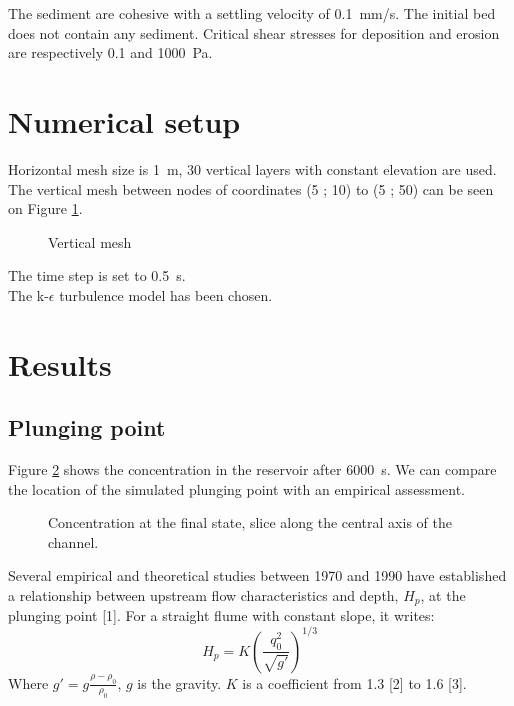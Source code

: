 The sediment are cohesive with a settling velocity of 0.1~mm/s. The initial bed does not contain any sediment. Critical shear stresses for deposition and erosion are respectively 0.1 and 1000~Pa.

%
\section{Numerical setup}

Horizontal mesh size is 1~m, 30 vertical layers with constant elevation are used. The vertical mesh between nodes of coordinates (5 ; 10) to (5 ; 50) can be seen on Figure \ref{fig:turbidity:mesh:section}.

\begin{figure}[H]
 \centering
  \caption{Vertical mesh}\label{fig:turbidity:mesh:section}
\end{figure}

The time step is set to 0.5~s.\\

The k-$\epsilon$ turbulence model has been chosen.


\section{Results}

\subsection{Plunging point}

Figure \ref{fig:turbidity:slice:conc} shows the concentration in the reservoir after 6000~s. We can compare the location of the simulated plunging point with an empirical assessment.\\

\begin{figure}[H]
 \centering
  \caption{Concentration at the final state, slice along the central axis of the channel.}\label{fig:turbidity:slice:conc}
\end{figure}

Several empirical and theoretical studies between 1970 and 1990 have established a relationship between upstream flow characteristics and depth, $H_p$, at the plunging point [1]. For a straight flume with constant slope, it writes:
\begin{equation}
H_p=K \left(\frac{q_0^2}{\sqrt{g'}}\right)^{1/3}
\label{eq:plung}
\end{equation}
Where  $g'=g\frac{\rho-\rho_0}{\rho_0}$, $g$ is the gravity. $K$ is a coefficient from 1.3 [2] to 1.6 [3].

